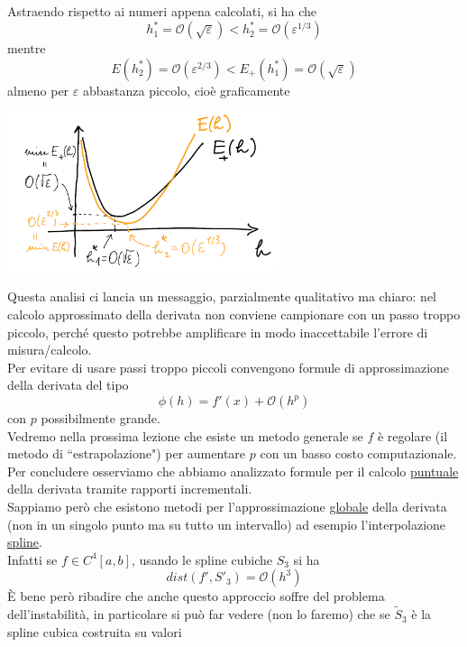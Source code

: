\documentclass[12pt,a4paper]{article}
\begin{document}
Astraendo rispetto ai numeri
appena calcolati, si ha che
\[
h_1^* = \mathcal{O}(\sqrt{\varepsilon}) < h_2^* = \mathcal{O}(\varepsilon^{1/3})
\]
mentre
\[
E(h_2^*) = \mathcal{O}(\varepsilon^{2/3}) < E_+(h_1^*) = \mathcal{O}(\sqrt{\varepsilon})
\]
almeno per $\varepsilon$ abbastanza piccolo, cioè graficamente
\begin{center}
    \includegraphics[width=0.6\textwidth]{pag29.png}
\end{center}
Questa analisi ci lancia un messaggio, parzialmente qualitativo ma chiaro: nel calcolo approssimato
della derivata non conviene campionare con un passo troppo piccolo, perché questo potrebbe amplificare in modo inaccettabile l'errore di misura/calcolo.\\
Per evitare di usare passi troppo piccoli convengono formule di approssimazione della derivata del tipo
\[
\phi(h) = f'(x) + \mathcal{O}(h^p)
\]
con $p$ possibilmente grande.\\
Vedremo nella prossima lezione che esiste un metodo generale se $f$ è regolare (il metodo di
``estrapolazione") per aumentare $p$ con un basso costo computazionale.\\
Per concludere osserviamo che abbiamo analizzato formule per il calcolo \uline{puntuale} della derivata tramite rapporti incrementali.\\
Sappiamo però che esistono metodi per l'approssimazione \uline{globale} della derivata (non in un singolo punto ma su tutto un intervallo) ad esempio l'interpolazione \uline{spline}.\\
Infatti se $f \in C^4 [a,b]$, usando le spline cubiche $S_3$ si ha
\[
dist(f', S'_3) = \mathcal{O}(h^3)
\]
È bene però ribadire che anche questo approccio soffre del problema dell'instabilità, in particolare si può far vedere (non lo faremo) che se $\tilde{S}_3$ è la spline cubica costruita su valori
\end{document}
